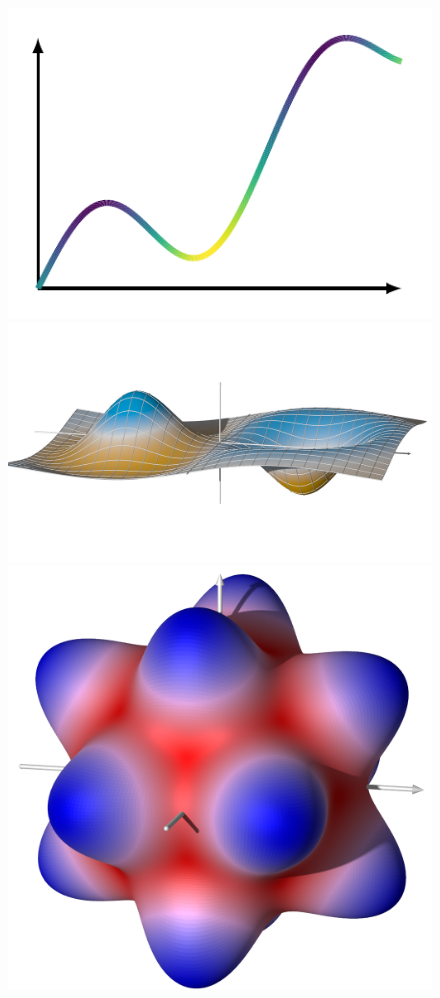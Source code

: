 \begin{figure}
  \centering
  \includegraphics[width=.3\linewidth]{papers/kugel/figures/tikz/curvature-1d}
  \hskip 5mm
  \includegraphics[width=.3\linewidth]{papers/kugel/figures/povray/curvature}
  \hskip 5mm
  \includegraphics[width=.3\linewidth]{papers/kugel/figures/povray/spherecurve}
  \caption{
    \label{kugel:fig:curvature}
  }
\end{figure}

